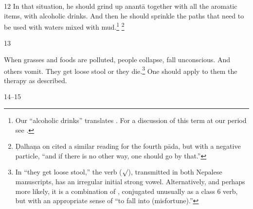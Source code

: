 \begin{translation}
\item
 [12]  In that situation, he should grind up  \gls{anantā} together with all the  
 aromatic items, with alcoholic drinks.  And then he should sprinkle the paths 
 that need to be used with waters mixed with  mud.\footnote{Our “alcoholic 
 drinks”  translates .  For a discussion of this  term at our period see 
 \cite[37--39 \emph{et passim}]{mchu-2021}.}  \footnote{Ḍalhaṇa on   
 cited a similar  reading for the fourth pāda, but with a negative particle, “and if 
 there is no other way, one  should go by that.”}  

\item [13]  

When grasses and foods are  polluted, people collapse, fall
unconscious. And others vomit. They get  loose 
stool or they  die.\footnote{In “they get loose stool,” the verb
     ($\surd$), transmitted in both Nepalese
    manuscripts, has an irregular initial strong vowel. Alternatively, and
    perhaps more likely, it is a combination of ,
    conjugated unusually as a class 6 verb, but with an appropriate sense
    of “to fall into (misfortune).”}  One should apply to them the therapy
    as described.

\item [14--15]  


\end{translation}
